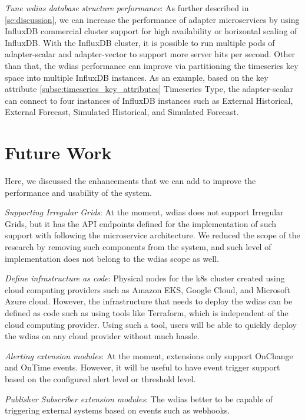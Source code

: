 \emph{Tune \acrshort{wdias} database structure performance}:
As further described in \cref{se:discussion}, we can increase the performance of adapter microservices by using InfluxDB commercial cluster support for high availability or horizontal scaling of InfluxDB. With the InfluxDB cluster, it is possible to run multiple pods of adapter-scalar and adapter-vector to support more server hits per second. Other than that, the \acrshort{wdias} performance can improve via partitioning the timeseries key space into multiple InfluxDB instances. As an example, based on the key attribute \cref{subse:timeseries_key_attributes} Timeseries Type, the adapter-scalar can connect to four instances of InfluxDB instances such as External Historical, External Forecast, Simulated Historical, and Simulated Forecast.

\section{Future Work}
\label{se:future_work}
Here, we discussed the enhancements that we can add to improve the performance and usability of the system.

\emph{Supporting Irregular Grids}:
At the moment, \acrshort{wdias} does not support Irregular Grids, but it has the API endpoints defined for the implementation of such support with following the microservice architecture. We reduced the scope of the research by removing such components from the system, and such level of implementation does not belong to the \acrshort{wdias} scope as well.

\emph{Define infrastructure as code}:
Physical nodes for the \acrshort{k8s} cluster created using cloud computing providers such as Amazon EKS, Google Cloud, and Microsoft Azure cloud. However, the infrastructure that needs to deploy the \acrshort{wdias} can be defined as code such as using tools like Terraform, which is independent of the cloud computing provider. Using such a tool, users will be able to quickly deploy the \acrshort{wdias} on any cloud provider without much hassle.

\emph{Alerting extension modules}: At the moment, extensions only support OnChange and OnTime events. However, it will be useful to have event trigger support based on the configured alert level or threshold level. 

\emph{Publisher Subscriber extension modules}: The \acrshort{wdias} better to be capable of triggering external systems based on events such as webhooks.
